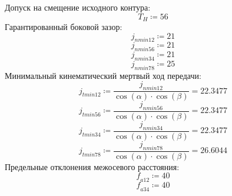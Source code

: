 \documentclass{article}
\newcommand{\defeq}{\coloneq} %
\begin{document}
\colorbox[HTML]{000000}{Допуск на смещение исходного контура:}\newline
\begin{equation*}
T_{H} \defeq 56
\end{equation*}
\colorbox[HTML]{000000}{Гарантированный боковой зазор:}\newline
\begin{equation*}
\textit{j}_{\textit{nmin12}} \defeq 21
\end{equation*}
\begin{equation*}
\textit{j}_{\textit{nmin56}} \defeq 21
\end{equation*}
\begin{equation*}
\textit{j}_{\textit{nmin34}} \defeq 21
\end{equation*}
\begin{equation*}
\textit{j}_{\textit{nmin78}} \defeq 25
\end{equation*}
\colorbox[HTML]{000000}{Минимальный кинематический мертвый ход передачи:}\newline
\begin{equation*}
\textit{j}_{\textit{tmin12}} \defeq \frac{\textit{j}_{\textit{nmin12}}}{\cos \left( {\alpha} \right) \cdot \cos \left( {\beta} \right)} = {22.3477}
\end{equation*}
\begin{equation*}
\textit{j}_{\textit{tmin56}} \defeq \frac{\textit{j}_{\textit{nmin56}}}{\cos \left( {\alpha} \right) \cdot \cos \left( {\beta} \right)} = {22.3477}
\end{equation*}
\begin{equation*}
\textit{j}_{\textit{tmin34}} \defeq \frac{\textit{j}_{\textit{nmin34}}}{\cos \left( {\alpha} \right) \cdot \cos \left( {\beta} \right)} = {22.3477}
\end{equation*}
\begin{equation*}
\textit{j}_{\textit{tmin78}} \defeq \frac{\textit{j}_{\textit{nmin78}}}{\cos \left( {\alpha} \right) \cdot \cos \left( {\beta} \right)} = {26.6044}
\end{equation*}
\colorbox[HTML]{000000}{Предельные отклонения межосевого расстояния:}\newline
\begin{equation*}
\textit{f}_{\textit{a12}} \defeq 40
\end{equation*}
\begin{equation*}
\textit{f}_{\textit{a34}} \defeq 40
\end{equation*}
\end{document}
